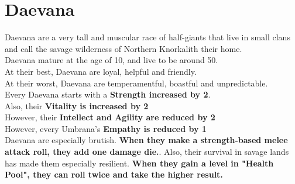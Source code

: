 \section{Daevana}
Daevana are a very tall and muscular race of half-giants that live in small clans and call the savage wilderness of Northern Knorkalith their home.\\
Daevana mature at the age of 10, and live to be around 50.\\
At their best, Daevana are loyal, helpful and friendly.\\
At their worst, Daevana are temperamentful, boastful and unpredictable.\\
Every Daevana starts with a \textbf{Strength increased by 2}.\\
Also, their \textbf{Vitality is increased by 2}\\
However, their \textbf{Intellect and Agility are reduced by 2}\\
However, every Umbrana's \textbf{Empathy is reduced by 1}\\
Daevana are especially brutish. \textbf{When they make a strength-based melee attack roll, they add one damage die.}. Also, their survival in savage lands has made them especially resilient. \textbf{When they gain a level in "Health Pool", they can roll twice and take the higher result.}\\